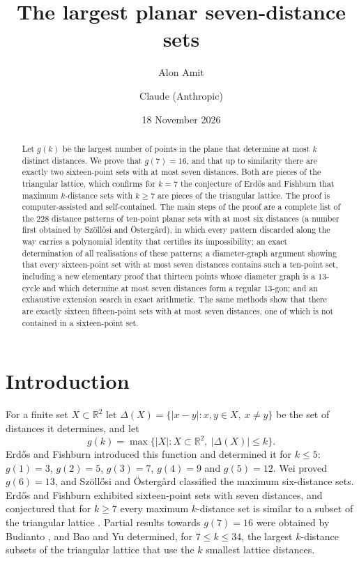 \documentclass[11pt]{amsart}
\title{The largest planar seven-distance sets}
\author{Alon Amit}
\author{Claude (Anthropic)}
\date{18 November 2026}
\theoremstyle{definition}
\theoremstyle{remark}
\newcommand{\R}{\mathbb{R}}
\begin{document}
\begin{abstract}
Let $g(k)$ be the largest number of points in the plane that determine at most $k$ distinct distances. We
prove that $g(7)=16$, and that up to similarity there are exactly two sixteen-point sets with at most seven
distances. Both are pieces of the triangular lattice, which confirms for $k=7$ the conjecture of Erdős and
Fishburn that maximum $k$-distance sets with $k\ge7$ are pieces of the triangular lattice. The proof is
computer-assisted and self-contained. The main steps of the proof
are a complete list of the $228$ distance patterns of ten-point planar sets with at most six distances (a
number first obtained by Szöllősi and Östergård), in which every pattern discarded along the way
carries a polynomial identity that certifies its impossibility; an exact determination of all
realisations of these patterns; a diameter-graph argument showing that every sixteen-point set with at
most seven distances contains such a ten-point set, including a new elementary proof that thirteen
points whose diameter graph is a $13$-cycle and which determine at most seven distances form a regular
$13$-gon; and an exhaustive extension search in exact arithmetic. The same methods show that there are
exactly sixteen fifteen-point sets with at most seven distances, one of which is not contained in a
sixteen-point set.
\end{abstract}

\maketitle

\section{Introduction}

For a finite set $X\subset\R^2$ let $\Delta(X)=\{|x-y| : x,y\in X,\ x\neq y\}$ be the set of distances it
determines, and let
\[
  g(k)=\max\{|X| : X\subset\R^2,\ |\Delta(X)|\le k\}.
\]
Erdős and Fishburn \cite{EF} introduced this function and determined it for $k\le5$:
$g(1)=3$, $g(2)=5$, $g(3)=7$, $g(4)=9$ and $g(5)=12$. Wei \cite{W} proved $g(6)=13$, and Szöllősi and
Östergård \cite{SO} classified the maximum six-distance sets. Erdős and Fishburn exhibited
sixteen-point sets with seven distances, and conjectured that for $k\ge7$ every maximum $k$-distance set
is similar to a subset of the triangular lattice \cite{EF}. Partial results towards $g(7)=16$ were
obtained by Budianto \cite{B}, and Bao and Yu \cite{BY} determined, for $7\le k\le34$, the largest
$k$-distance subsets of the triangular lattice that use the $k$ smallest lattice distances.
\end{document}
